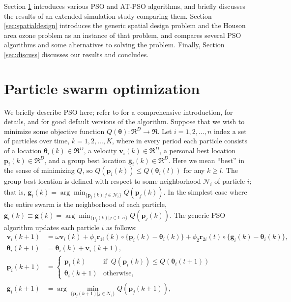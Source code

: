 \documentclass[cmbright]{staauth}
\begin{document}
Section \ref{sec:pso} introduces various PSO and AT-PSO algorithms, and briefly discusses the results of an extended simulation study comparing them. Section \ref{sec:spatialdesign} introduces the generic spatial design problem and the Houson area ozone problem as an instance of that problem, and compares several PSO algorithms and some alternatives to solving the problem. Finally, Section \ref{sec:discuss} discusses our results and concludes.

\section{Particle swarm optimization}\label{sec:pso}
We briefly describe PSO here; refer to \citet{blum2008swarm} for a comprehensive introduction, \citet{clerc2010particle} for details, and \citet{clerc2011spso} for good default versions of the algorithm. Suppose that we wish to minimize some objective function $Q(\bm{\theta}):\Re^D\to\Re$. Let $i=1,2,\dots,n$ index a set of particles over time, $k=1,2,\dots,K$, where in every period each particle consists of a location $\bm{\theta}_i(k)\in \Re^D$, a velocity $\bm{v}_i(k) \in \Re^D$, a personal best location $\bm{p}_i(k)\in\Re^D$, and a group best location $\bm{g}_i(k)\in\Re^D$. Here we mean ``best'' in the sense of minimizing $Q$, so $Q(\bm{p}_i(k)) \leq Q(\bm{\theta}_i(l))$ for any $k\geq l$. The group best location is defined with respect to some neighborhood $\mathcal{N}_i$ of particle $i$; that is, $\bm{g}_i(k) = \arg\min_{\{\bm{p}_j(k)|j\in\mathcal{N}_i\}}Q(\bm{p}_j(k))$. In the simplest case where the entire swarm is the neighborhood of each particle, $\bm{g}_i(k)\equiv \bm{g}(k) = \arg\min_{\{\bm{p}_j(k)|j\in 1:n\}}Q(\bm{p}_j(k))$. The generic PSO algorithm updates each particle $i$ as follows:
\begin{align}\label{eq:pso}
\bm{v}_i(k+1) &= \omega \bm{v}_i(k) + \phi_1 \bm{r}_{1i}(k)\circ\{\bm{p}_i(k) - \bm{\theta}_i(k)\} + \phi_2 \bm{r}_{2i}(t)\circ\{\bm{g}_i(k) - \bm{\theta}_i(k)\},\nonumber\\
\bm{\theta}_i(k+1) &= \bm{\theta}_i(k) + \bm{v}_i(k+1),\nonumber\\
\bm{p}_i(k+1) &= \begin{cases} \bm{p}_i(k)   & \mbox{if }\  Q(\bm{p}_i(k)) \le Q(\bm{\theta}_i(t + 1))\\
                               \bm{\theta}_i(k+1) & \mbox{otherwise},
\end{cases}\nonumber\\
\bm{g}_i(k+1) &= \arg\min_{\{\bm{p}_j(k+1)|j\in\mathcal{N}_i\}}Q(\bm{p}_j(k+1)),
\end{align}
\end{document}
